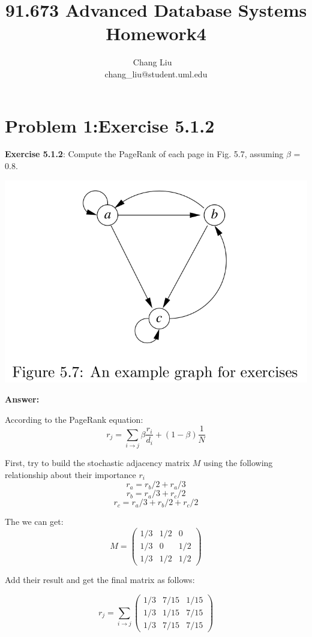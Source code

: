 \documentclass{article}
\author{Chang Liu ~\\ chang\_liu@student.uml.edu}
\title{91.673 Advanced Database Systems Homework4}
\begin{document}
\maketitle

\section{Problem 1:Exercise 5.1.2}

\textbf{Exercise 5.1.2}: Compute the PageRank of each page in Fig. 5.7, assuming $\beta$ = 0.8. ~\\
\begin{center}
\includegraphics[scale=0.3]{hw3-figure5_7.png}
\end{center}

\textbf{Answer:}

According to the PageRank equation: $$r_j = \sum\limits_{i \rightarrow j}{\beta\frac{r_i}{d_i} + (1-\beta)\frac{1}{N}}$$

First, try to build the stochastic adjacency matrix $M$ using the following relationship about their importance $r_i$
$$r_a = r_b/2 + r_a/3$$
$$r_b = r_a/3 + r_c/2$$
$$r_c = r_a/3 + r_b/2 + r_c/2$$

The we can get:
\begin{equation}
M = \begin{pmatrix} 1/3 & 1/2 & 0 \\ 1/3 & 0 & 1/2 \\ 1/3 & 1/2 & 1/2 \end{pmatrix} 
\end{equation}

Add their result and get the final matrix as follows:

$$r_j = \sum\limits_{i \rightarrow j}{\begin{pmatrix} 1/3 & 7/15 & 1/15 \\ 1/3 & 1/15 & 7/15 \\ 1/3 & 7/15 & 7/15 \end{pmatrix}}$$
\end{document}
